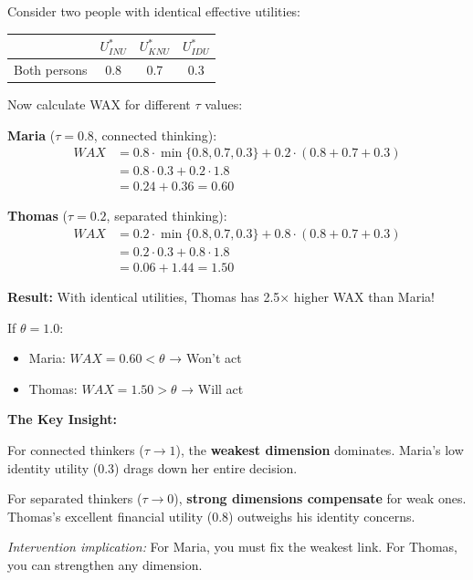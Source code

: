 \begin{example}
Consider two people with identical effective utilities:
\begin{center}
\begin{tabular}{lccc}
\toprule
& $U_{INU}^*$ & $U_{KNU}^*$ & $U_{IDU}^*$ \\
\midrule
Both persons & 0.8 & 0.7 & 0.3 \\
\bottomrule
\end{tabular}
\end{center}

Now calculate WAX for different $\tau$ values:

\textbf{Maria} ($\tau = 0.8$, connected thinking):
\begin{align*}
WAX &= 0.8 \cdot \min\{0.8, 0.7, 0.3\} + 0.2 \cdot (0.8 + 0.7 + 0.3)\\
&= 0.8 \cdot 0.3 + 0.2 \cdot 1.8\\
&= 0.24 + 0.36 = \mathbf{0.60}
\end{align*}

\textbf{Thomas} ($\tau = 0.2$, separated thinking):
\begin{align*}
WAX &= 0.2 \cdot \min\{0.8, 0.7, 0.3\} + 0.8 \cdot (0.8 + 0.7 + 0.3)\\
&= 0.2 \cdot 0.3 + 0.8 \cdot 1.8\\
&= 0.06 + 1.44 = \mathbf{1.50}
\end{align*}

\textbf{Result:} With identical utilities, Thomas has 2.5× higher WAX than Maria!

If $\theta = 1.0$:
\begin{itemize}
\item Maria: $WAX = 0.60 < \theta$ → Won't act
\item Thomas: $WAX = 1.50 > \theta$ → Will act
\end{itemize}
\end{example}

\begin{intuition}
\textbf{The Key Insight:}

For connected thinkers ($\tau \to 1$), the \textbf{weakest dimension} 
dominates. Maria's low identity utility (0.3) drags down her entire decision.

For separated thinkers ($\tau \to 0$), \textbf{strong dimensions compensate} 
for weak ones. Thomas's excellent financial utility (0.8) outweighs his 
identity concerns.

\textit{Intervention implication:} For Maria, you must fix the weakest link. 
For Thomas, you can strengthen any dimension.
\end{intuition}

